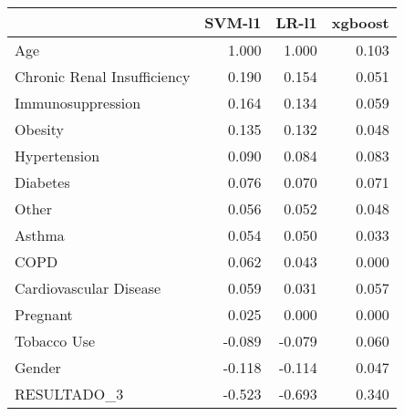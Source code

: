 \begin{tabular}{lrrr}
\toprule
{} &  SVM-l1 &  LR-l1 &  xgboost \\
\midrule
Age                         &   1.000 &  1.000 &    0.103 \\
Chronic Renal Insufficiency &   0.190 &  0.154 &    0.051 \\
Immunosuppression           &   0.164 &  0.134 &    0.059 \\
Obesity                     &   0.135 &  0.132 &    0.048 \\
Hypertension                &   0.090 &  0.084 &    0.083 \\
Diabetes                    &   0.076 &  0.070 &    0.071 \\
Other                       &   0.056 &  0.052 &    0.048 \\
Asthma                      &   0.054 &  0.050 &    0.033 \\
COPD                        &   0.062 &  0.043 &    0.000 \\
Cardiovascular Disease      &   0.059 &  0.031 &    0.057 \\
Pregnant                    &   0.025 &  0.000 &    0.000 \\
Tobacco Use                 &  -0.089 & -0.079 &    0.060 \\
Gender                      &  -0.118 & -0.114 &    0.047 \\
RESULTADO\_3                 &  -0.523 & -0.693 &    0.340 \\
\bottomrule
\end{tabular}
